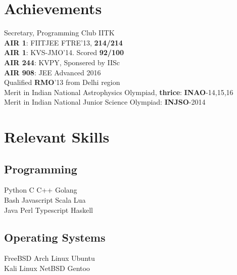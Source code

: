 \documentclass[]{deedy-resume-openfont}
\begin{document}
\begin{minipage}[t]{0.30\textwidth}
\section{Achievements}
\vspace{0.1cm}
Secretary, Programming Club IITK \\
\vspace{0.1cm}
\textbf{AIR 1}: FIITJEE FTRE'13, \textbf{214/214}\\
\vspace{0.1cm}
\textbf{AIR 1}: KVS-JMO'14. Scored \textbf{92/100}\\
\vspace{0.1cm}
\textbf{AIR 244}: KVPY, Sponsered by IISc \\
\vspace{0.1cm}
\textbf{AIR 908}: JEE Advanced 2016\\
\vspace{0.1cm}
Qualified \textbf{RMO}'13 from Delhi region\\
\vspace{0.1cm}
Merit in Indian National Astrophysics Olympiad, \textbf{thrice}: \textbf{INAO}-14,15,16 \\
\vspace{0.1cm}
Merit in Indian National Junior Science Olympiad: \textbf{INJSO}-2014 \\


\section{Relevant Skills}
\subsection{Programming}
Python \textbullet{} C \textbullet{} C++ \textbullet{} Golang \\
 \vspace{0.1 cm}
Bash \textbullet{} Javascript \textbullet{} Scala \textbullet{} Lua \\
 Java \textbullet{} Perl \textbullet{} Typescript \textbullet{} Haskell \\
\vspace{0.4 cm}
\subsection{Operating Systems}
FreeBSD \textbullet{} Arch Linux \textbullet{} Ubuntu \\
Kali Linux \textbullet{} NetBSD \textbullet{} Gentoo
\vspace{0.4 cm}

\end{minipage}
\end{document}
